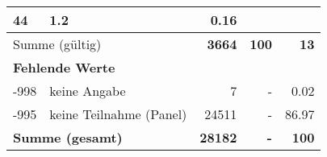 \begin{longtable}{lXrrr}
       \num{44} &
       \num[round-mode=places,round-precision=2]{1,2} &
         \num[round-mode=places,round-precision=2]{0,16} \\
     \midrule
     \multicolumn{2}{l}{Summe (gültig)} &
       \textbf{\num{3664}} &
     \textbf{100} &
       \textbf{\num[round-mode=places,round-precision=2]{13}} \\
     \multicolumn{5}{l}{\textbf{Fehlende Werte}}\\
       -998 &
       keine Angabe &
         \num{7} &
        - &
         \num[round-mode=places,round-precision=2]{0,02} \\
       -995 &
       keine Teilnahme (Panel) &
         \num{24511} &
        - &
         \num[round-mode=places,round-precision=2]{86,97} \\
     \midrule
     \multicolumn{2}{l}{\textbf{Summe (gesamt)}} &
          \textbf{\num{28182}} &
        \textbf{-} &
        \textbf{100} \\
     \bottomrule
     \end{longtable}
     

